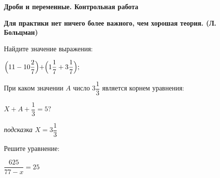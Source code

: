 \centerline{\bf \Huge Дроби и переменные. Контрольная работа}
\centerline{\bf \Huge }

\begin{flushright}
        \scriptsize{\textbf{Для практики нет ничего более важного, чем хорошая теория. (Л. Больцман)}}
\end{flushright}

 Найдите значение выражения:

$\Bigr(11 - 10\dfrac{2}{7}\Bigl) + \Bigr(1\dfrac{1}{7} + 3\dfrac{1}{7}\Bigl);$

 При каком значении $A$ число $3\dfrac{1}{3}$ является корнем уравнения:

$X+A+\dfrac{1}{3}=5?$

\textit{подсказка $X=3\dfrac{1}{3}$}

 Решите уравнение:

$\dfrac{625}{77-x} = 25$




